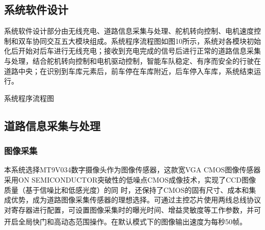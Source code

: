 \documentclass{article}%
\begin{document}
\begin{multicols}{2}
		\section{系统软件设计}
		系统软件设计部分由无线充电、道路信息采集与处理、舵机转向控制、电机速度控制和双车协同交互五大模块组成。系统程序流程图如图10所示，系统对各模块初始化后开始对后车进行无线充电；接收到充电完成的信号后进行正常的道路信息采集与处理，结合舵机转向控制和电机驱动控制，智能车队稳定、有序而安全的行驶在道路中央；在识别到车库元素后，前车停在车库附近，后车停入车库，系统结束运行。	
			\begin{center}
				\caption{系统程序流程图}		
			\end{center}				
		\subsection{道路信息采集与处理}
		
		\subsubsection{图像采集}
		本系统选择MT9V034数字摄像头作为图像传感器，这款宽VGA CMOS图像传感器采用ON SEMICONDUCTOR突破性的低噪点CMOS成像技术，实现了CCD图像质量（基于信噪比和低感光度）的同 时，还保持了CMOS的固有尺寸、成本和集成优势，成为道路图像采集传感器的理想选择。可通过主控芯片使用两线总线协议对寄存器进行配置，可设置图像采集时的曝光时间、增益灵敏度等工作参数，并可开启全局快门和高动态范围操作。在默认模式下的图像输出速度为每秒50帧\textsuperscript{\cite{ref5}}。
		

\end{multicols}
\end{document}
